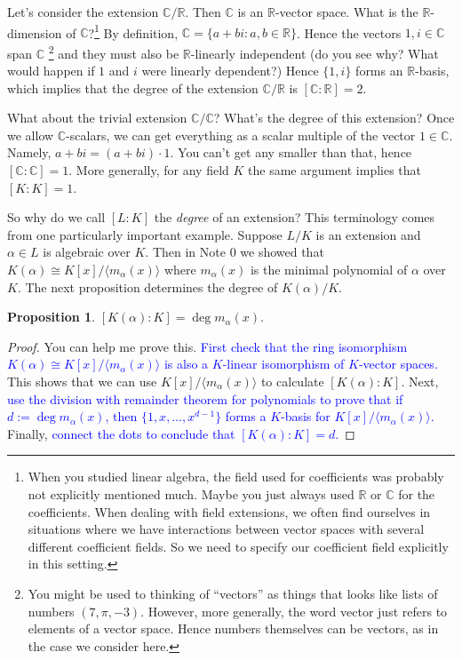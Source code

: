 \documentclass[11pt]{article}
\def\RR{\mathbb{R}}
\def\CC{\mathbb{C}}
\theoremstyle{definition}
\newtheorem{proposition}[theorem]{Proposition}
\numberwithin{equation}{subsection}
\newcommand{\blue}[1]{\textcolor{blue}{#1}}
\begin{document}
Let's consider the extension $\CC/\RR$.
Then $\CC$ is an $\RR$-vector space.
What is the $\RR$-dimension of $\CC$?\footnote{When you studied linear algebra, the field used for coefficients was probably not explicitly mentioned much.
Maybe you just always used $\RR$ or $\CC$ for the coefficients.
When dealing with field extensions, we often find ourselves in situations where we have interactions between vector spaces with several different coefficient fields.
So we need to specify our coefficient field explicitly in this setting.}
By definition, $\CC = \{a + bi : a, b \in \RR\}$.
Hence the vectors $1, i \in \CC$ span $\CC$
\footnote{You might be used to thinking of ``vectors'' as things that looks like lists of numbers $(7,\pi,-3)$.
However, more generally, the word vector just refers to elements of a vector space.
Hence numbers themselves can be vectors, as in the case we consider here.}
and they must also be $\RR$-linearly independent (do you see why?
What would happen if $1$ and $i$ were linearly dependent?)
Hence $\{1,i\}$ forms an $\RR$-basis, which implies that the degree of the extension $\CC/\RR$ is $[\CC : \RR] = 2$.

What about the trivial extension $\CC/\CC$?
What's the degree of this extension?
Once we allow $\CC$-scalars, we can get everything as a scalar multiple of the vector $1 \in \CC$.
Namely, $a + bi = (a + bi)\cdot 1$.
You can't get any smaller than that, hence $[\CC : \CC] = 1$.
More generally, for any field $K$ the same argument implies that $[K : K] = 1$.

So why do we call $[L : K]$ the \emph{degree} of an extension?
This terminology comes from one particularly important example.
Suppose $L/K$ is an extension and $\alpha \in L$ is algebraic over $K$.
Then in Note 0 we showed that $K(\alpha) \cong K[x]/\langle m_\alpha(x)\rangle$ where $m_\alpha(x)$ is the minimal polynomial of $\alpha$ over $K$.
The next proposition determines the degree of $K(\alpha)/K$.

\begin{proposition}
\label{prop: degree}
    $[K(\alpha) : K] = \deg m_\alpha(x)$.
\end{proposition}

\begin{proof}
    You can help me prove this.
    \blue{First check that the ring isomorphism $K(\alpha) \cong K[x]/\langle m_\alpha(x)\rangle$ is also a $K$-linear isomorphism of $K$-vector spaces.}
    This shows that we can use $K[x]/\langle m_\alpha(x)\rangle$ to calculate $[K(\alpha) : K]$.
    Next, \blue{use the division with remainder theorem for polynomials to prove that if $d := \deg m_\alpha(x)$, then $\{1,x,\ldots, x^{d-1}\}$ forms a $K$-basis for $K[x]/\langle m_\alpha(x)\rangle$.}
    Finally, \blue{connect the dots to conclude that $[K(\alpha) : K] = d$.}
\end{proof}
\end{document}
